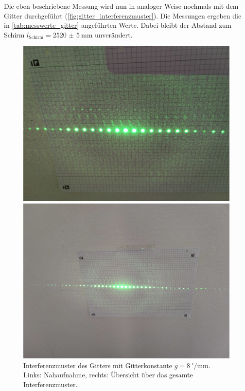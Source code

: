 \documentclass[ngerman]{scrartcl}
\begin{document}
%
Die eben beschriebene Messung wird nun in analoger Weise nochmals mit dem Gitter durchgeführt (\autoref{fig:gitter_interferenzmuster}). Die Messungen ergeben die in \autoref{tab:messwerte_gitter} angeführten Werte. Dabei bleibt der Abstand zum Schirm $l_\text{Schirm} = \SI{2520(5)}{\milli\meter}$ unverändert.
%
\setcapindent{0pt}
\begin{figure}[H]
    \centering
    \begin{minipage}[t]{0.45\linewidth}
        \centering
        \includegraphics[width=\linewidth]{fig/Compressed/Gitter_8_per_mm.jpg}
    \end{minipage}%
    \hspace*{\fill}
    \begin{minipage}[t]{0.45\linewidth}
        \centering
        \includegraphics[width=\linewidth]{fig/Compressed/Gitter_8_per_mm_overview.jpg}
    \end{minipage}
    \caption[Interferenzmuster des Gitters]{Interferenzmuster des Gitters mit Gitterkonstante $g=\SI{8}{'\per\milli\meter}$. Links: Nahaufnahme, rechts: Übersicht über das gesamte Interferenzmuster.}
    \label{fig:gitter_interferenzmuster}
\end{figure}
\end{document}
